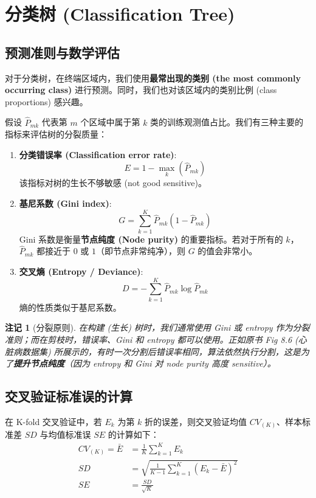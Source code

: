 \documentclass[UTF8]{ctexart}
\newtheorem{remark}{注记}[section]
\numberwithin{equation}{section}
\begin{document}
\section{分类树 (Classification Tree)}
\subsection{预测准则与数学评估}
对于分类树，在终端区域内，我们使用\textbf{最常出现的类别 (the most commonly occurring class)} 进行预测。同时，我们也对该区域内的类别比例 (class proportions) 感兴趣。

假设 $\hat{P}_{mk}$ 代表第 $m$ 个区域中属于第 $k$ 类的训练观测值占比。我们有三种主要的指标来评估树的分裂质量：
\begin{enumerate}
    \item \textbf{分类错误率 (Classification error rate)}:
    \begin{equation}
        E = 1 - \max_k (\hat{P}_{mk})
    \end{equation}
    该指标对树的生长不够敏感 (not good sensitive)。
    \item \textbf{基尼系数 (Gini index)}:
    \begin{equation}
        G = \sum_{k=1}^K \hat{P}_{mk}(1-\hat{P}_{mk})
    \end{equation}
    Gini 系数是衡量\textbf{节点纯度 (Node purity)} 的重要指标。若对于所有的 $k$，$\hat{P}_{mk}$ 都接近于 $0$ 或 $1$（即节点非常纯净），则 $G$ 的值会非常小。
    \item \textbf{交叉熵 (Entropy / Deviance)}:
    \begin{equation}
        D = -\sum_{k=1}^K \hat{P}_{mk} \log \hat{P}_{mk}
    \end{equation}
    熵的性质类似于基尼系数。
\end{enumerate}

\begin{remark}[分裂原则]
在构建 (生长) 树时，我们通常使用 Gini 或 entropy 作为分裂准则；而在剪枝时，错误率、Gini 和 entropy 都可以使用。正如原书 Fig 8.6 (心脏病数据集) 所展示的，有时一次分割后错误率相同，算法依然执行分割，这是为了\textbf{提升节点纯度}（因为 entropy 和 Gini 对 node purity 高度 sensitive）。
\end{remark}

\subsection{交叉验证标准误的计算}
在 K-fold 交叉验证中，若 $E_k$ 为第 $k$ 折的误差，则交叉验证均值 $CV_{(K)}$、样本标准差 $SD$ 与均值标准误 $SE$ 的计算如下：
\begin{align}
    CV_{(K)} = \bar{E} &= \frac{1}{K} \sum_{k=1}^K E_k \\
    SD &= \sqrt{\frac{1}{K-1} \sum_{k=1}^K (E_k - \bar{E})^2} \\
    SE &= \frac{SD}{\sqrt{K}}
\end{align}
\end{document}
